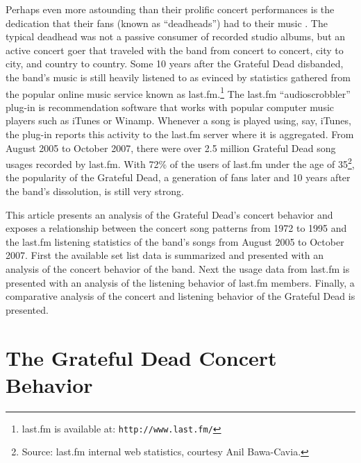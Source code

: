 \documentclass{svmult}
\begin{document}
Perhaps even more astounding than their prolific concert performances is the dedication that their fans (known as ``deadheads'') had to their music \cite{deadheads:grushkin1983,adams:deadhead1998,sardiello:deadhead, deadhead:pattacini}. The typical deadhead was not a passive consumer of recorded studio albums, but an active concert goer that traveled with the band from concert to concert, city to city, and country to country. Some 10 years after the Grateful Dead disbanded, the band's music is still heavily listened to as evinced by statistics gathered from the popular online music service known as last.fm.\footnote{last.fm is available at: \texttt{http://www.last.fm/}} The last.fm ``audioscrobbler'' plug-in is recommendation software that works with popular computer music players such as iTunes or Winamp.  Whenever a song is played using, say, iTunes, the plug-in reports this activity to the last.fm server where it is aggregated. From August 2005 to October 2007, there were over 2.5 million Grateful Dead song usages recorded by last.fm. With 72\% of the users of last.fm under the age of 35\footnote{Source: last.fm internal web statistics, courtesy Anil Bawa-Cavia.}, the popularity of the Grateful Dead, a generation of fans later and 10 years after the band's dissolution, is still very strong. 

This article presents an analysis of the Grateful Dead's concert behavior and exposes a relationship between the concert song patterns from 1972 to 1995 and the last.fm listening statistics of the band's songs from August 2005 to October 2007. First the available set list data is summarized and presented with an analysis of the concert behavior of the band. Next the usage data from last.fm is presented with an analysis of the listening behavior of last.fm members. Finally, a comparative analysis of the concert and listening behavior of the Grateful Dead is presented.

\section{The Grateful Dead Concert Behavior\label{sec:concert}}
\end{document}
